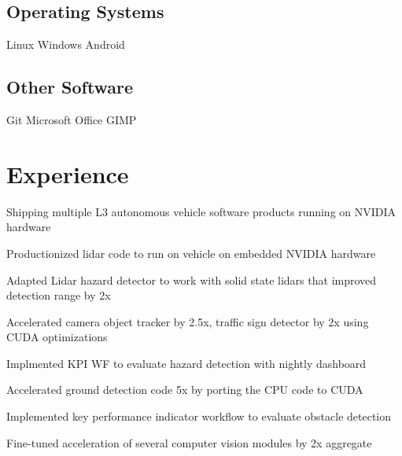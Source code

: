 \documentclass[]{deedy-resume-openfont}
\begin{document}
\begin{minipage}[t]{0.3\textwidth}
\subsection{Operating Systems}
Linux \textbullet{} Windows \textbullet{} Android \\
\sectionsep
\subsection{Other Software}
Git \textbullet{} Microsoft Office \textbullet{} GIMP \\
\sectionsep

%
%

\end{minipage}
\hfill
\begin{minipage}[t]{0.69\textwidth}


\section{Experience}

\vspace{\topsep} %
\begin{tightemize}
\item Shipping multiple L3 autonomous vehicle software products running on NVIDIA hardware
\item Productionized lidar code to run on vehicle on embedded NVIDIA hardware
\item Adapted Lidar hazard detector to work with solid state lidars that improved detection range by 2x
\item Accelerated camera object tracker by 2.5x, traffic sign detector by 2x using CUDA optimizations
\item Implmented KPI WF to evaluate hazard detection with nightly dashboard
\item Accelerated ground detection code 5x by porting the CPU code to CUDA
\item Implemented key performance indicator workflow to evaluate obstacle detection
\item Fine-tuned acceleration of several computer vision modules by 2x aggregate
\end{tightemize}
\sectionsep


\end{minipage}
\end{document}
